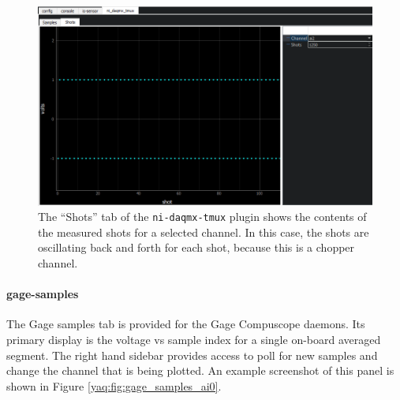\begin{landscape}
\begin{figure}
\includegraphics[width=8in]{"yaq/images/ni_daq_shots"}
\caption[\yaqcqtpy{} NI DAQmx Tmux Plugin (shots)]{
	The ``Shots'' tab of the \texttt{ni-daqmx-tmux} plugin shows the contents of the measured shots for a selected channel.
	In this case, the shots are oscillating back and forth for each shot, because this is a chopper channel.
}
\label{yaq:fig:ni_daq_shots}
\end{figure}
\end{landscape}


\paragraph{gage-samples}

The Gage samples tab is provided for the Gage Compuscope daemons.
Its primary display is the voltage vs sample index for a single on-board averaged segment.
The right hand sidebar provides access to poll for new samples and change the channel that is being plotted.
An example screenshot of this panel is shown in Figure \ref{yaq:fig:gage_samples_ai0}.

